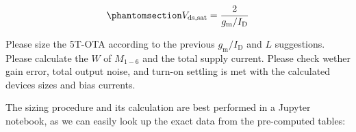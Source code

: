 \documentclass[
  a4paper,
  DIV=11,
  numbers=noendperiod]{scrartcl}
\begin{document}
\begin{equation}\phantomsection\label{eq-gmid-saturation}{
V_\mathrm{ds,sat} = \frac{2}{g_\mathrm{m}/I_\mathrm{D}}
}\end{equation}

\begin{tcolorbox}[enhanced jigsaw, titlerule=0mm, left=2mm, coltitle=black, toprule=.15mm, breakable, opacitybacktitle=0.6, colframe=quarto-callout-tip-color-frame, bottomtitle=1mm, toptitle=1mm, opacityback=0, colbacktitle=quarto-callout-tip-color!10!white, title=\textcolor{quarto-callout-tip-color}{\faLightbulb}\hspace{0.5em}{Exercise: 5T-OTA Sizing}, arc=.35mm, rightrule=.15mm, colback=white, bottomrule=.15mm, leftrule=.75mm]

Please size the 5T-OTA according to the previous
\(g_\mathrm{m}/I_\mathrm{D}\) and \(L\) suggestions. Please calculate
the \(W\) of \(M_{1-6}\) and the total supply current. Please check
wether gain error, total output noise, and turn-on settling is met with
the calculated devices sizes and bias currents.

\end{tcolorbox}

The sizing procedure and its calculation are best performed in a Jupyter
notebook, as we can easily look up the exact data from the pre-computed
tables:
\end{document}
